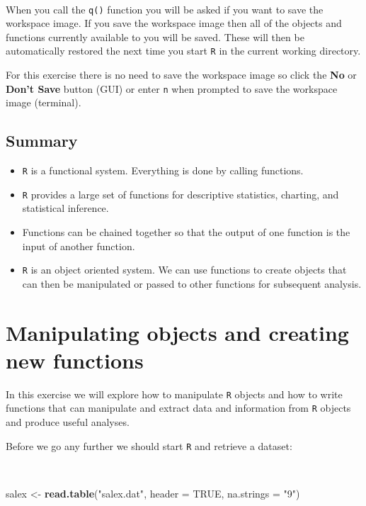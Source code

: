 \documentclass[12pt,a4paper]{book}
\newenvironment{Shaded}{\begin{snugshade}}{\end{snugshade}}
\newcommand{\DataTypeTok}[1]{\textcolor[rgb]{0.13,0.29,0.53}{#1}}
\newcommand{\KeywordTok}[1]{\textcolor[rgb]{0.13,0.29,0.53}{\textbf{#1}}}
\newcommand{\NormalTok}[1]{#1}
\newcommand{\OtherTok}[1]{\textcolor[rgb]{0.56,0.35,0.01}{#1}}
\newcommand{\StringTok}[1]{\textcolor[rgb]{0.31,0.60,0.02}{#1}}
\providecommand{\tightlist}{%
  \setlength{\itemsep}{0pt}\setlength{\parskip}{0pt}}
\theoremstyle{definition}
\theoremstyle{definition}
\theoremstyle{definition}
\theoremstyle{remark}
\begin{document}
~

When you call the \texttt{q()} function you will be asked if you want to
save the workspace image. If you save the workspace image then all of
the objects and functions currently available to you will be saved.
These will then be automatically restored the next time you start
\texttt{R} in the current working directory.

For this exercise there is no need to save the workspace image so click
the \textbf{No} or \textbf{Don't Save} button (GUI) or enter \texttt{n}
when prompted to save the workspace image (terminal).

\hypertarget{summary}{%
\section{Summary}\label{summary}}

\begin{itemize}
\tightlist
\item
  \texttt{R} is a functional system. Everything is done by calling
  functions.
\item
  \texttt{R} provides a large set of functions for descriptive
  statistics, charting, and statistical inference.
\item
  Functions can be chained together so that the output of one function
  is the input of another function.
\item
  \texttt{R} is an object oriented system. We can use functions to
  create objects that can then be manipulated or passed to other
  functions for subsequent analysis.
\end{itemize}

\hypertarget{exercise2}{%
\chapter{Manipulating objects and creating new
functions}\label{exercise2}}

In this exercise we will explore how to manipulate \texttt{R} objects
and how to write functions that can manipulate and extract data and
information from \texttt{R} objects and produce useful analyses.

Before we go any further we should start \texttt{R} and retrieve a
dataset:

~

\begin{Shaded}
\begin{Highlighting}[]
\NormalTok{salex <-}\StringTok{ }\KeywordTok{read.table}\NormalTok{(}\StringTok{"salex.dat"}\NormalTok{, }\DataTypeTok{header =} \OtherTok{TRUE}\NormalTok{, }\DataTypeTok{na.strings =} \StringTok{"9"}\NormalTok{)}
\end{Highlighting}
\end{Shaded}
\end{document}
